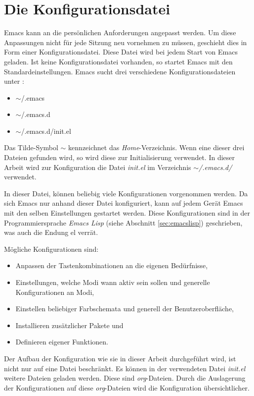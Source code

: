 \section{Die Konfigurationsdatei}
\label{sec:konfdatgl}
Emacs kann an die persönlichen Anforderungen angepasst werden. Um
diese Anpassungen nicht für jede Sitzung neu vornehmen zu müssen,
geschieht dies in Form einer Konfigurationsdatei. Diese Datei wird bei
jedem Start von Emacs geladen. Ist keine Konfigurationsdatei
vorhanden, so startet Emacs mit den Standardeinstellungen. Emacs sucht
drei verschiedene Konfigurationsdateien unter \cite{EmacsInitfile}:
\begin{itemize}
\item $\sim$/.emacs
\item $\sim$/.emacs.d
\item $\sim$/.emacs.d/init.el
\end{itemize}
Das Tilde-Symbol {\glqq}$\sim${\grqq} kennzeichnet das
\textit{Home}-Verzeichnis.  Wenn eine dieser drei Dateien gefunden
wird, so wird diese zur Initialisierung verwendet. In dieser Arbeit
wird zur Konfiguration die Datei \textit{init.el} im Verzeichnis
\textit{$\sim$/.emacs.d/} verwendet.

In dieser Datei, können beliebig viele Konfigurationen vorgenommen
werden. Da sich Emacs nur anhand dieser Datei konfiguriert, kann auf
jedem Gerät Emacs mit den selben Einstellungen gestartet werden. Diese
Konfigurationen sind in der Programmiersprache \textit{Emacs Lisp}
(siehe Abschnitt \ref{sec:emacslisp}) geschrieben, was auch die Endung
{\glqq}el{\grqq} verrät.

Mögliche Konfigurationen sind:
\begin{itemize}
\item Anpassen der Tastenkombinationen an die eigenen Bedürfnisse,
\item Einstellungen, welche Modi wann aktiv sein sollen und generelle
  Konfigurationen an Modi,
\item Einstellen beliebiger Farbschemata und generell der
  Benutzeroberfläche,
\item Installieren zusätzlicher Pakete und
\item Definieren eigener Funktionen.\\
\end{itemize}
Der Aufbau der Konfiguration wie sie in dieser Arbeit durchgeführt
wird, ist nicht nur auf eine Datei beschränkt. Es können in der
verwendeten Datei \textit{init.el} weitere Dateien geladen
werden. Diese sind \textit{org}-Dateien. Durch die Auslagerung der
Konfigurationen auf diese \textit{org}-Dateien wird die Konfiguration
übersichtlicher.\\

